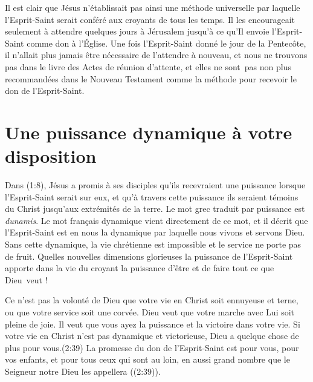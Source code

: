 Il est clair que Jésus n'établissait pas ainsi une méthode universelle par
 laquelle l'Esprit-Saint serait conféré aux croyants de tous les temps. Il les
 encourageait seulement à attendre quelques jours à Jérusalem jusqu'à ce
 qu'Il envoie l'Esprit-Saint comme don à l'Église. Une fois l'Esprit-Saint
 donné le jour de la Pentecôte, il n'allait plus jamais être nécessaire de
 l'attendre à nouveau, et nous ne trouvons pas dans
 le livre des Actes de réunion d'attente, et elles ne sont~pas non plus
 recommandées dans le Nouveau Testament comme la méthode pour recevoir le don de
 l'Esprit-Saint.


\section{Une puissance dynamique à votre disposition}

Dans (1:8), Jésus a promis à ses disciples
 qu'ils recevraient une puissance lorsque l'Esprit-Saint serait
 sur eux, et qu'à travers cette puissance ils seraient témoins
 du Christ jusqu'aux extrémités de la terre.
 Le mot grec traduit par \Og puissance \Fg{} est \emph{dunamis}.
 Le mot français \Og dynamique \Fg{} vient directement de ce mot,
 et il décrit que l'Esprit-Saint est en nous \ocadr la dynamique par laquelle
 nous vivons et servons Dieu. Sans cette dynamique, la vie chrétienne est
 impossible et le service ne porte pas de fruit.
 Quelles nouvelles dimensions glorieuses la puissance de l'Esprit-Saint
 apporte dans la vie du croyant \ocadr la puissance d'être et de faire
 tout ce que Dieu~veut !

Ce n'est pas la volonté de Dieu que votre vie en Christ soit ennuyeuse
 et terne, ou que votre service soit une corvée.
 Dieu veut que votre marche avec Lui soit pleine de joie.
 Il veut que vous ayez la puissance et la victoire dans votre vie.
 Si votre vie en Christ n'est pas dynamique et victorieuse,
 Dieu a quelque chose de plus pour vous.(2:39)
 La promesse du don de l'Esprit-Saint est \Og pour vous, pour vos enfants,
 et pour tous ceux qui sont au loin,
 en aussi grand nombre que le Seigneur notre Dieu les appellera \Fg{}
 ((2:39)).
\closechapter
